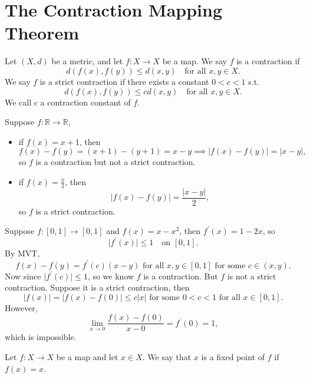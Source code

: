 \section{The Contraction Mapping Theorem}

\begin{definition}
    Let \((X, d)\) be a metric, and let \(f: X \to X\) be a map. We say \(f\) is a contraction if 
    \[
        d(f(x), f(y)) \le d(x, y) \quad \text{for all } x, y \in X. 
    \]   
    We say \(f\) is a strict contraction if there exists a constant \(0 < c < 1\) s.t. 
    \[
        d(f(x), f(y)) \le cd(x, y) \quad \text{for all } x,y \in X.
    \]
    We call \(c\) a contraction constant of \(f\).    
\end{definition}

\begin{eg}
    Suppose \(f: \mathbb{R} \to \mathbb{R} \), 
    \begin{itemize}
        \item [(a)] if \(f(x) = x + 1\), then 
        \[
            f(x) - f(y) = (x + 1) - (y + 1) = x - y \implies \vert f(x) - f(y) \vert = \vert x - y \vert,  
        \]
        so \(f\) is a contraction but not a strict contraction. 
        \item [(b)] if \(f(x) = \frac{x}{2}\), then 
        \[
            \vert f(x) - f(y) \vert = \frac{\vert x - y \vert }{2}, 
        \]
        so \(f\) is a strict contraction. 
    \end{itemize} 
\end{eg}

\begin{eg}
    Suppose \(f: [0, 1] \to [0, 1]\) and \(f(x) = x - x^2\), then \(f^{\prime} (x) = 1 - 2x\), so 
    \[
        \vert f^{\prime} (x) \vert \le 1 \quad \text{on } [0, 1].  
    \]
    By MVT, 
    \[
        f(x) - f(y) = f^{\prime} (c) (x - y) \text{ for all } x,y \in [0, 1] \text{ for some } c \in (x, y).  
    \]   
    Now since \(\vert f^{\prime} (c) \vert \le 1 \), so we know \(f\) is a contraction. But \(f\) is not a strict contraction. Suppose it is a strict contraction, then 
    \[
        \vert f(x) \vert = \vert f(x) - f(0) \vert \le c \vert x \vert \text{ for some } 0 < c < 1 \text{ for all } x \in [0, 1].    
    \]
    However, 
    \[
        \lim_{x \to 0} \frac{f(x) - f(0)}{x - 0} = f^{\prime} (0) = 1,
    \]  
    which is impossible.
\end{eg}

\begin{definition}
    Let \(f: X \to X\) be a map and let \(x \in X\). We say that \(x\) is a fixed point of \(f\) if \(f(x) = x\).      
\end{definition}

